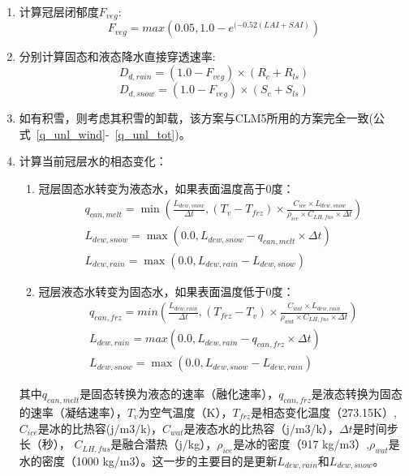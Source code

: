 \begin{enumerate}
\item 计算冠层闭郁度$F_{veg}$:
\begin{equation}
F_{veg} =max(0.05,1.0-e^{(-0.52\left(LAI+SAI\right)})
\end{equation}
\item 分别计算固态和液态降水直接穿透速率:
\begin{equation}
D_{d,rain}=\left(1.0-F_{veg}\right) \times (R_{c}+R_{ls})
\end{equation}
\begin{equation}
D_{d,snow}=\left(1.0-F_{veg}\right) \times (S_{c}+S_{ls})
\end{equation}
\item 如有积雪，则考虑其积雪的卸载，该方案与CLM5所用的方案完全一致(公式~\ref{q_unl_wind}-~\ref{q_unl_tot})。
\item 计算当前冠层水的相态变化：
\begin{enumerate}
\item 冠层固态水转变为液态水，如果表面温度高于0度：
\begin{equation}
\begin{array}{c}q_{can, melt}=\min \left(\frac{L_{dew,snow}}{\Delta t},\left(T_{v}-T_{frz}\right) \times \frac{C_{ice} \times L_{dew,snow}}{\rho_{i c e} \times C_{LH, fus} \times \Delta t}\right) \\ L_{dew,snow}=\max \left(0.0, L_{dew,snow}-q_{c a n, m e l t} \times \Delta t\right) \\ L_{dew,rain }=\max \left(0.0, L_{dew,rain}-L_{dew,snow}\right)\end{array}
\end{equation}
\item 冠层液态水转变为固态水，如果表面温度低于0度：
\begin{equation}
\begin{array}{c}q_{c a n, f r z}=min \left(\frac{L_{dew,rain}}{\Delta t},\left(T_{f r z}-T_{v}\right) \times \frac{C_{wat} \times L_{dew,rain}}{\rho_{wat} \times C_{LH, fus} \times \Delta t}\right) \\ L_{dew,rain}=max \left(0.0, L_{dew,rain}-q_{can, frz} \times \Delta t\right) \\ L_{dew,snow}=\max \left(0.0, L_{dew,snow}-L_{dew,rain}\right)\end{array}
\end{equation}
\end {enumerate}
其中$q_{can, melt}$是固态转换为液态的速率（融化速率），$q_{can, frz}$是液态转换为固态的速率（凝结速率），$T_{v}$为空气温度（K），$T_{frz}$是相态变化温度（273.15K）,$C_{ice}$是冰的比热容(j/m3/k)，$C_{wat}$是液态水的比热容（j/m3/k），$\Delta t$是时间步长（秒）， $C_{LH, fus}$是融合潜热（j/kg），$\rho_{i c e}$是冰的密度（917 kg/m3）,$\rho_{wat}$是水的密度（1000 kg/m3）。这一步的主要目的是更新$L_{dew,rain}$和$L_{dew,snow}$。


\end{enumerate}
